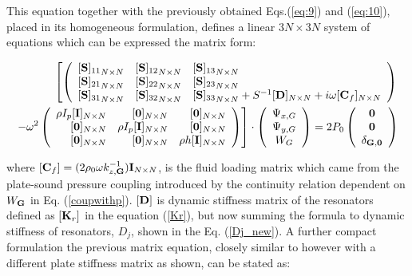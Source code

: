 \documentclass[a4paper]{ICEDyn}
\begin{document}
This equation together with the previously obtained Eqs.(\ref{eq:9}) and (\ref{eq:10}), placed in its homogeneous formulation, defines a linear $3N\times 3N$ system of equations which can be expressed the matrix form:
	
    \begin{eqnarray}
	\left [
    \left (
	\begin{array}{l l l l}
	{[{\bf S}]_{11} }_{N\times N}&
	{[{\bf S}]_{12} }_{N\times N} &
	{[{\bf S}]_{13} }_{N\times N}\\
	{[{\bf S}]_{21} }_{N\times N} &
	{[{\bf S}]_{22} }_{N\times N} &
	{[{\bf S}]_{23} }_{N\times N} \\	
    {[{\bf S}]_{31} }_{N\times N} &
	{[{\bf S}]_{32} }_{N\times N} & 
    {[{\bf S}]_{33} }_{N\times N} 
      + S^{-1}[{\bf D}]_{N\times N} 
      + i\omega[{\bf C}_f]_{N\times N}	
    \end{array}
	\right )\right .\nonumber\\
	\left .
	- \omega^2 \left(
	\begin{array}{r r r r}
	\rho I_p [{\bf I}]_{N\times N}&
	\ [{\bf 0}]_{N \times N}& 
	\ [{\bf 0}]_{N \times N}\\
	\ [{\bf 0}]_{N \times N}& 
 	\rho I_p [{\bf I}]_{N\times N} & 
	\ [{\bf 0}]_{N \times N}\\
	\ [{\bf 0}]_{N \times N} &  
	\ [{\bf 0}]_{N \times N} &
 	\rho h[{\bf I}]_{N\times N}
	\end{array}
	\right )
	\right ] \cdot
%
    \left(
	\begin{array}{c}
	\Psi_{x,G}\\
	\Psi_{y,G}\\
	W_{G}\\
	\end{array}
	\right)
    = 2P_0 \left(
	\begin{array}{c}
	{\bf 0}\\
	{\bf 0}\\
	 \delta_{\bf G,0}\\
	\end{array}
	\right)\label{matr_stl}
	\end{eqnarray}

where $[{\bf C}_f]= (2\rho_0\omega k_{z,{\bf G}}^{-1}) {\bf I}_{N\times N}$, is the fluid loading matrix which came from the plate-sound pressure coupling introduced  by the continuity relation dependent on $W_{\bf G}$ in Eq. (\ref{coupwithp}). $[{\bf D}]$ is dynamic stiffness matrix of the resonators defined as $[{\bf K}_r]$ in the equation (\ref{Kr}), but now summing the formula to dynamic stiffness of resonators, $D_j$, shown in the Eq. (\ref{Dj_new}). A further compact formulation the previous matrix equation, closely similar to  \cite{Xiao2012s} however with a different plate stiffness matrix as shown, can be stated as: 
\end{document}
